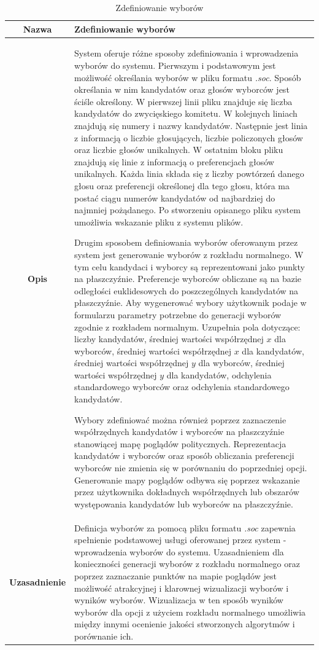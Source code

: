 \documentclass[polish,11pt]{aghthesis}
\begin{document}
\begin{table}
\centering
\begin{tabular}{|c|p{13cm}|}
\hline
\textbf{Nazwa} & Zdefiniowanie wyborów \\ 
\hline 
\textbf{Opis} & System oferuje różne sposoby zdefiniowania i wprowadzenia wyborów
do systemu. Pierwszym i podstawowym jest możliwość określania
wyborów w pliku formatu \textit{.soc}. Sposób określania w nim kandydatów
oraz głosów wyborców jest ściśle określony. W pierwszej linii pliku
znajduje się liczba kandydatów do zwycięskiego komitetu. W kolejnych
liniach znajdują się numery i nazwy kandydatów. Następnie jest linia z
informacją o liczbie głosujących, liczbie policzonych głosów oraz liczbie
głosów unikalnych. W ostatnim bloku pliku znajdują się linie z
informacją o preferencjach głosów unikalnych. Każda linia składa się z
liczby powtórzeń danego głosu oraz preferencji określonej dla tego
głosu, która ma postać ciągu numerów kandydatów od najbardziej do
najmniej pożądanego. Po stworzeniu opisanego pliku system umożliwia
wskazanie pliku z systemu plików.

Drugim sposobem definiowania wyborów oferowanym przez system
jest generowanie wyborów z rozkładu normalnego. W tym celu
kandydaci i wyborcy są reprezentowani jako punkty na płaszczyźnie.
Preferencje wyborców obliczane są na bazie odległości euklidesowych
do poszczególnych kandydatów na płaszczyźnie. Aby wygenerować
wybory użytkownik podaje w formularzu parametry potrzebne do
generacji wyborów zgodnie z rozkładem normalnym. Uzupełnia pola
dotyczące: liczby kandydatów, średniej wartości współrzędnej $x$ dla
wyborców, średniej wartości współrzędnej $x$ dla kandydatów, średniej
wartości współrzędnej $y$ dla wyborców, średniej wartości współrzędnej
$y$ dla kandydatów, odchylenia standardowego wyborców oraz
odchylenia standardowego kandydatów. 

Wybory zdefiniować można również poprzez zaznaczenie współrzędnych kandydatów i wyborców na 
płaszczyźnie stanowiącej mapę poglądów politycznych. Reprezentacja kandydatów i wyborców oraz sposób
obliczania preferencji wyborców nie zmienia się w porównaniu do poprzedniej opcji.
Generowanie mapy poglądów odbywa się poprzez wskazanie przez użytkownika dokładnych współrzędnych lub
obszarów występowania kandydatów lub wyborców na płaszczyźnie.\\ 


\hline 
\textbf{Uzasadnienie} & Definicja wyborów za pomocą pliku formatu \textit{.soc} zapewnia spełnienie
podstawowej usługi oferowanej przez system - wprowadzenia wyborów
do systemu. Uzasadnieniem dla konieczności generacji wyborów z
rozkładu normalnego oraz poprzez zaznaczanie punktów na mapie poglądów jest możliwość atrakcyjnej i 
klarownej wizualizacji wyborów i wyników wyborów. Wizualizacja w ten sposób wyników
wyborów dla opcji z użyciem rozkładu normalnego umożliwia między innymi ocenienie jakości stworzonych
algorytmów i porównanie ich.\\ 
\hline 
\end{tabular}
\caption{Zdefiniowanie wyborów} 
\end{table}
\newpage
\end{document}
